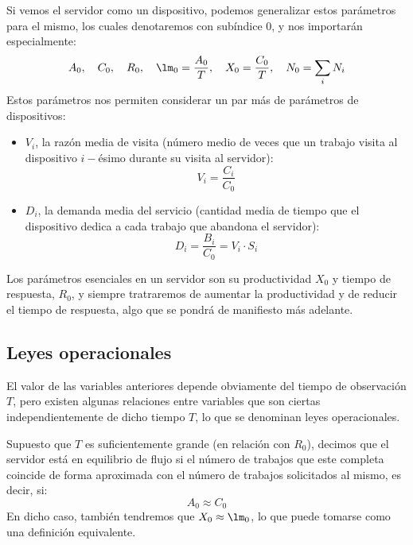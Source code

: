 Si vemos el servidor como un dispositivo, podemos generalizar estos parámetros para el mismo, los cuales denotaremos con subíndice $0$, y nos importarán especialmente:
\begin{equation*}
    A_0,\quad C_0,\quad R_0,\quad \lm_0 = \dfrac{A_0}{T},\quad X_0 = \dfrac{C_0}{T},\quad N_0 = \sum_{i} N_i
\end{equation*}
Estos parámetros nos permiten considerar un par más de parámetros de dispositivos:
\begin{itemize}
    \item $V_i$, la razón media de visita (número medio de veces que un trabajo visita al dispositivo $i-$ésimo durante su visita al servidor):
        \begin{equation*}
            V_i = \dfrac{C_i}{C_0}
        \end{equation*}
    \item $D_i$, la demanda media del servicio (cantidad media de tiempo que el dispositivo dedica a cada trabajo que abandona el servidor):
        \begin{equation*}
            D_i = \dfrac{B_i}{C_0} = V_i\cdot S_i
        \end{equation*}
\end{itemize}

Los parámetros esenciales en un servidor son su productividad $X_0$ y tiempo de respuesta, $R_0$, y siempre tratraremos de aumentar la productividad y de reducir el tiempo de respuesta, algo que se pondrá de manifiesto más adelante.

\subsection{Leyes operacionales}
El valor de las variables anteriores depende obviamente del tiempo de observación $T$, pero existen algunas relaciones entre variables que son ciertas independientemente de dicho tiempo $T$, lo que se denominan leyes operacionales.

\begin{definicion}
    Supuesto que $T$ es suficientemente grande (en relación con $R_0$), decimos que el servidor está en equilibrio de flujo si el número de trabajos que este completa coincide de forma aproximada con el número de trabajos solicitados al mismo, es decir, si:
    \begin{equation*}
        A_0\approx C_0
    \end{equation*}
    En dicho caso, también tendremos que $X_0\approx \lm_0$, lo que puede tomarse como una definición equivalente.
\end{definicion}

